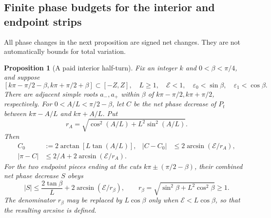 \documentclass[11pt]{article}
\newtheorem{proposition}[theorem]{Proposition}
\theoremstyle{definition}
\begin{document}
\subsection{Finite phase budgets for the interior and endpoint strips}
All phase changes in the next proposition are signed net changes.
They are not automatically bounds for total variation.
\begin{proposition}[A paid interior half-turn]\label{asym:phase-budget}
Fix an integer $k$ and $0<\beta<\pi/4$, and suppose
\[
 [k\pi-\pi/2-\beta,k\pi+\pi/2+\beta]\subset[-Z,Z],
 \quad L\ge1,\quad\mathcal E<1,
 \quad\varepsilon_0<\sin\beta,\quad\varepsilon_1<\cos\beta.
\]
There are adjacent simple roots $a_-,a_+$ within $\beta$ of
$k\pi-\pi/2,k\pi+\pi/2$, respectively.  For
$0<A/L<\pi/2-\beta$, let $C$ be the net phase decrease of $P_t$
between $k\pi-A/L$ and $k\pi+A/L$.  Put
\[
 r_A=\sqrt{\cos^2(A/L)+L^2\sin^2(A/L)}.
\]
Then
\begin{align}
 C_0&:=2\arctan[L\tan(A/L)],&
 |C-C_0|&\le2\arcsin(\mathcal E/r_A),\label{asym:central-bound}\\
 |\pi-C|&\le2/A+2\arcsin(\mathcal E/r_A).\label{asym:outside-bound}
\end{align}
For the two endpoint pieces ending at the cuts
$k\pi\pm(\pi/2-\beta)$, their combined net phase decrease $S$ obeys
\begin{equation}\label{asym:endpoint-bound}
 |S|\le\frac{2\tan\beta}{L}
       +2\arcsin(\mathcal E/r_\beta),\qquad
 r_\beta=\sqrt{\sin^2\beta+L^2\cos^2\beta}\ge1.
\end{equation}
The denominator $r_\beta$ may be replaced by $L\cos\beta$ only when
$\mathcal E<L\cos\beta$, so that the resulting arcsine is defined.
\end{proposition}
\end{document}

